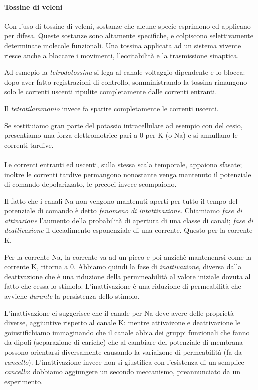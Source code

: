 \documentclass[a4paper,12pt]{article}
\begin{document}
\paragraph{Tossine di veleni}

Con l'uso di tossine di veleni, sostanze che alcune specie esprimono ed applicano per difesa. Queste sostanze sono altamente specifiche, e colpiscono selettivamente determinate molecole funzionali. Una tossina applicata ad un sistema vivente riesce anche a bloccare i movimenti, l'eccitabilità e la trasmissione sinaptica.

Ad esmepio la \emph{tetrodotossina} si lega al canale voltaggio dipendente e lo blocca: dopo aver fatto registrazioni di controllo, somministrando la tossina rimangono solo le correnti uscenti ripulite completamente dalle correnti entranti.

Il \emph{tetrotilammonio} invece fa sparire completamente le correnti uscenti.

Se sostituiamo gran parte del potassio intracellulare ad esempio con del cesio, presentiamo una forza elettromotrice pari a 0 per K (o Na) e si annullano le correnti tardive.

\paragraph{}
Le correnti entranti ed uscenti, sulla stessa scala temporale, appaiono sfasate; inoltre le correnti tardive permangono nonostante venga mantenuto il potenziale di comando depolarizzato, le precoci invece scompaiono.

Il fatto che i canali Na non vengono mantenuti aperti per tutto il tempo del potenziale di comando è detto \emph{fenomeno di intattivazione}. Chiamiamo \emph{fase di attivazione} l'aumento della probabilità di apertura di una classe di canali; \emph{fase di deattivazione} il decadimento esponenziale di una corrente. Questo per la corrente K.

Per la corrente Na, la corrente va ad un picco e poi anzichè mantenenrsi come la corrente K, ritorna a 0. Abbiamo quindi la fase di \emph{inattivazione}, diversa dalla deattvazione che è una riduzione della permmeabilità al valore iniziale dovuta al fatto che cessa lo stimolo. L'inattivazione è una riduzione di permeabilità che avviene \emph{durante} la persistenza dello stimolo.

L'inattivazione ci suggerisce che il canale per Na deve avere delle proprietà diverse, aggiuntive rispetto al canale K: mentre attivaizone e deattivazione le goiustifichiamo immaginando che il canale abbia dei gruppi funzionali che fanno da dipoli (separazione di cariche) che al cambiare del potenziale di membrana possono orientarsi diversamente causando la variaizone di permeabilità (fa da \emph{cancello}). L'inattivazione invece non si giustifica con l'esistenza di un semplice \emph{cancello}: dobbiamo aggiungere un secondo meccanismo, preannunciato da un esperimento.
\end{document}
